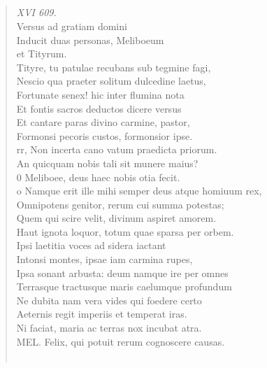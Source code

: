 \documentclass[11pt, a4paper]{report}
\begin{document}
            \subsection*{}
      \begin{verse}
      \textit{XVI 609.} \\ Versus ad gratiam domini \\ Inducit duas personas, Meliboeum \\ et Tityrum. \\ Tityre, tu patulae recubans sub tegmine fagi, \\ Nescio qua praeter solitum dulcedine laetus, \\ Fortunate senex! hic inter flumina nota \\ Et fontis sacros deductos dicere versus \\ Et cantare paras divino carmine, pastor, \\ Formonsi pecoris custos, formonsior ipse. \\ rr, Non incerta cano vatum praedicta priorum. \\ An quicquam nobis tali sit munere maius? \\ 0 Meliboee, deus haec nobis otia fecit. \\ o Namque erit ille mihi semper deus atque homiuum rex, \\ Omnipotens genitor, rerum cui summa potestas; \\ Quem qui scire velit, divinum aspiret amorem. \\ Haut ignota loquor, totum quae sparsa per orbem. \\ Ipsi laetitia voces ad sidera iactant \\ Intonsi montes, ipsae iam carmina rupes, \\ Ipsa sonant arbusta: deum namque ire per omnes \\ Terrasque tractusque maris caelumque profundum \\ Ne dubita nam vera vides qui foedere certo \\ Aeternis regit imperiis et temperat iras. \\ Ni faciat, maria ac terras nox incubat atra. \\ MEL. Felix, qui potuit rerum cognoscere causas. \\ 
        ﻿\pagebreak 

\end{verse}
\end{document}
